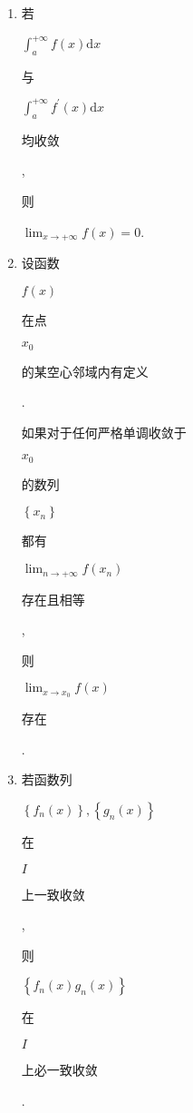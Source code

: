 \documentclass[10pt]{article}
\begin{document}
\begin{enumerate}
  \item \begin{CJK}{UTF8}{mj}若\end{CJK} $\int_{a}^{+\infty} f(x) \mathrm{d} x$ \begin{CJK}{UTF8}{mj}与\end{CJK} $\int_{a}^{+\infty} f^{\prime}(x) \mathrm{d} x$ \begin{CJK}{UTF8}{mj}均收敛\end{CJK}, \begin{CJK}{UTF8}{mj}则\end{CJK} $\lim _{x \rightarrow+\infty} f(x)=0$.

  \item \begin{CJK}{UTF8}{mj}设函数\end{CJK} $f(x)$ \begin{CJK}{UTF8}{mj}在点\end{CJK} $x_{0}$ \begin{CJK}{UTF8}{mj}的某空心邻域内有定义\end{CJK}. \begin{CJK}{UTF8}{mj}如果对于任何严格单调收敛于\end{CJK} $x_{0}$ \begin{CJK}{UTF8}{mj}的数列\end{CJK} $\left\{x_{n}\right\}$ \begin{CJK}{UTF8}{mj}都有\end{CJK} $\lim _{n \rightarrow+\infty} f\left(x_{n}\right)$ \begin{CJK}{UTF8}{mj}存在且相等\end{CJK}, \begin{CJK}{UTF8}{mj}则\end{CJK} $\lim _{x \rightarrow x_{0}} f(x)$ \begin{CJK}{UTF8}{mj}存在\end{CJK}.

  \item \begin{CJK}{UTF8}{mj}若函数列\end{CJK} $\left\{f_{n}(x)\right\},\left\{g_{n}(x)\right\}$ \begin{CJK}{UTF8}{mj}在\end{CJK} $I$ \begin{CJK}{UTF8}{mj}上一致收敛\end{CJK}, \begin{CJK}{UTF8}{mj}则\end{CJK} $\left\{f_{n}(x) g_{n}(x)\right\}$ \begin{CJK}{UTF8}{mj}在\end{CJK} $I$ \begin{CJK}{UTF8}{mj}上必一致收敛\end{CJK}.

\end{enumerate}
\end{document}
